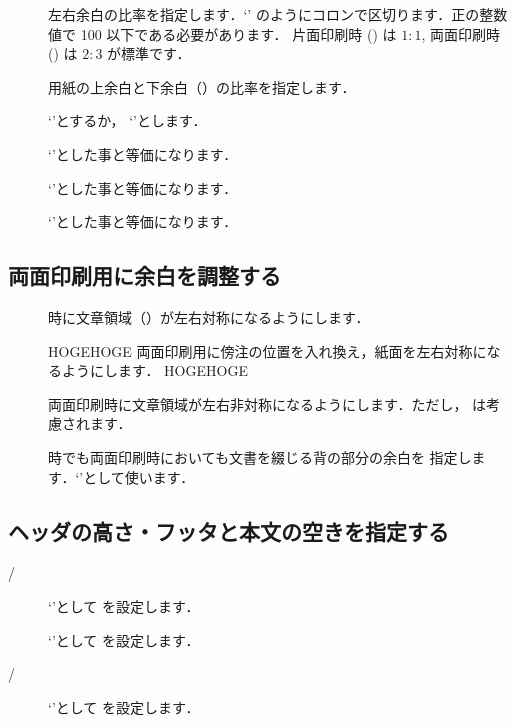 \begin{description}
 \item[]
  左右余白の比率を指定します．`'
  のようにコロンで区切ります．正の整数値で 100 以下である必要があります．
  片面印刷時 () は $1:1$, 両面印刷時 ()
  は $2:3$ が標準です．
  \item[]
  用紙の上余白と下余白（）の比率を指定します．
 \item[]
  `'とするか，
  `'とします．
 \item[]
  `'とした事と等価になります．
 \item[]
  `'とした事と等価になります．
 \item[]
  `'とした事と等価になります．
\end{description}

\subsection{両面印刷用に余白を調整する}

\begin{description}
 \item[]
  時に文章領域（）が左右対称になるようにします．
 \item[] 
HOGEHOGE
  両面印刷用に傍注の位置を入れ換え，紙面を左右対称になるようにします．
HOGEHOGE
 \item[]
  両面印刷時に文章領域が左右非対称になるようにします．ただし，
  は考慮されます．
 \item[]
  時でも両面印刷時においても文書を綴じる背の部分の余白を
  指定します．`'として使います．
\end{description}

\subsection{ヘッダの高さ・フッタと本文の空きを指定する}
\begin{description}
 \item[/] 
  `'として  を設定します．
 \item[] 
  `'として  を設定します．
 \item[/] 
  `'として  を設定します．
\end{description}


